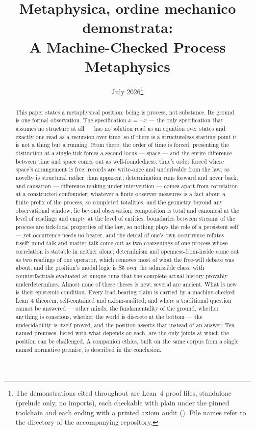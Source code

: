 \documentclass[11pt]{article}
\title{\textbf{Metaphysica, ordine mechanico demonstrata:}\\
\large A Machine-Checked Process Metaphysics}
\author{}
\date{July 2026\thanks{The demonstrations cited throughout are Lean~4 proof files, standalone (prelude only, no imports), each checkable with plain \lf{lean} under the pinned toolchain \lf{leanprover/lean4:v4.31.0} and each ending with a printed axiom audit (\lf{\#print axioms}). File names refer to the \lf{lean/} directory of the accompanying repository.}}
\theoremstyle{remark}
\begin{document}
\maketitle

\begin{abstract}
\noindent
This paper states a metaphysical position: being is process, not substance. Its ground is one formal observation. The specification $x = \lnot x$ --- the only specification that assumes no structure at all --- has no solution read as an equation over states and exactly one read as a recursion over time, so if there is a structureless starting point it is not a thing but a running. From there: the order of time is forced; presenting the distinction at a single tick forces a second locus --- space --- and the entire difference between time and space comes out as well-foundedness, time's order forced where space's arrangement is free; records are write-once and underivable from the law, so novelty is structural rather than apparent; determination runs forward and never back, and causation --- difference-making under intervention --- comes apart from correlation at a constructed confounder; whatever a finite observer measures is a fact about a finite prefix of the process, so completed totalities, and the geometry beyond any observational window, lie beyond observation; composition is total and canonical at the level of readings and empty at the level of entities; boundaries between streams of the process are tick-local properties of the law, so nothing plays the role of a persistent self --- yet occurrence needs no bearer, and the denial of one's own occurrence refutes itself; mind-talk and matter-talk come out as two coarsenings of one process whose correlation is statable in neither alone; determinism and openness-from-inside come out as two readings of one operator, which removes most of what the free-will debate was about; and the position's modal logic is S5 over the admissible class, with counterfactuals evaluated at unique runs that the complete actual history provably underdetermines. Almost none of these theses is new; several are ancient. What is new is their epistemic condition. Every load-bearing claim is carried by a machine-checked Lean~4 theorem, self-contained and axiom-audited; and where a traditional question cannot be answered --- other minds, the fundamentality of the ground, whether anything is conscious, whether the world is discrete at the bottom --- the undecidability is itself proved, and the position asserts that instead of an answer. Ten named premises, listed with what depends on each, are the only joints at which the position can be challenged. A companion ethics, built on the same corpus from a single named normative premise, is described in the conclusion.
\end{abstract}
\end{document}
